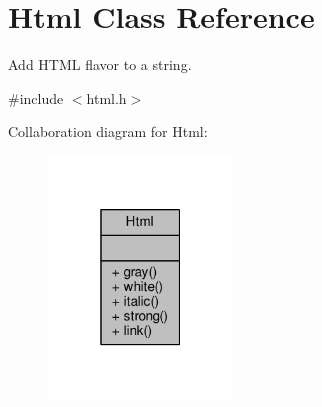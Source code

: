 \hypertarget{classHtml}{}\section{Html Class Reference}
\label{classHtml}


Add H\+T\+ML flavor to a string.  




{\ttfamily \#include $<$html.\+h$>$}



Collaboration diagram for Html\+:
\nopagebreak
\begin{figure}[H]
\begin{center}
\leavevmode
\includegraphics[width=139pt]{classHtml__coll__graph}
\end{center}
\end{figure}
